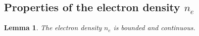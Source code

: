 \documentclass{article}
\newtheorem{lem}{Lemma}[section]
\numberwithin{equation}{section}
\begin{document}
{%
}

\subsection{Properties of the electron density $n_e$}

\begin{lem}\label{lem:ne_continuous_space}
	The electron density $n_e$ is bounded and continuous.
\end{lem}
\end{document}
